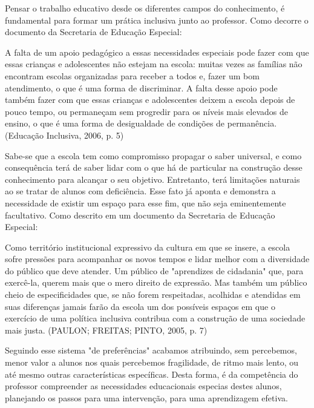 \documentclass[brasil]{abnt}
\begin{document}
	Pensar o trabalho educativo desde os diferentes campos do conhecimento, é fundamental para formar um prática inclusiva junto ao professor. Como decorre o documento da Secretaria de Educação Especial:
	
		\begin{citacao} A falta de um apoio pedagógico a essas necessidades especiais pode fazer com que essas crianças e adolescentes não estejam na escola: muitas vezes as famílias não encontram escolas 
						organizadas para receber a todos e, fazer um bom atendimento, o que é uma forma de discriminar. A falta desse apoio pode também fazer com que essas crianças e adolescentes deixem a 
						escola depois de pouco tempo, ou permaneçam sem progredir para os níveis mais elevados de ensino, o que é uma forma de desigualdade de condições de permanência. 
						(Educação Inclusiva, 2006, p. 5)
		\end{citacao}

	Sabe-se que a escola tem como compromisso propagar o saber universal, e como consequência terá de saber lidar com o que há de particular na construção desse conhecimento para alcançar o seu objetivo. 
	Entretanto, terá limitações naturais ao se tratar de alunos com deficiência. Esse fato já aponta e demonstra a necessidade de existir um espaço para esse fim, que não seja eminentemente facultativo.
	Como descrito em um documento da Secretaria de Educação Especial:
		
		\begin{citacao}Como território institucional expressivo da cultura em que se insere, a escola sofre pressões para acompanhar os novos tempos e lidar melhor com a diversidade do público que deve atender. 
						Um público de "aprendizes de cidadania" que, para exercê-la, querem mais que o mero direito de expressão. Mas também um público cheio de especificidades que, se não forem respeitadas, 
						acolhidas e atendidas em suas diferenças jamais farão da escola um dos possíveis espaços em que o exercício de uma política inclusiva contribua com a construção de uma sociedade mais 
						justa. (PAULON; FREITAS; PINTO, 2005, p. 7)
		\end{citacao}
	
	Seguindo esse sistema "de preferências" acabamos atribuindo, sem percebemos, menor valor a alunos nos quais percebemos fragilidade, de ritmo mais lento, ou até mesmo outras características específicas. 
	Desta forma, é da competência do professor compreender as necessidades educacionais especias destes alunos, planejando os passos para uma intervenção, para uma aprendizagem efetiva.
		
\end{document}
